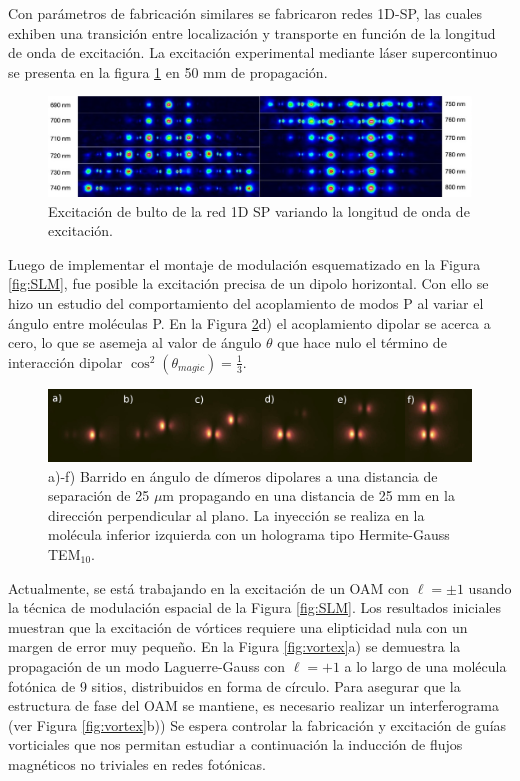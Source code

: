 \documentclass{article}
\begin{document}
Con parámetros de fabricación similares se fabricaron redes 1D-SP, las cuales exhiben una transición entre localización y transporte en función de la longitud de onda de excitación. La excitación experimental mediante láser supercontinuo se presenta en la figura \ref{fig:super} en 50 mm de propagación.

\begin{figure}[H]
	\centering
	\includegraphics[width=1.0\linewidth]{./media/SP1D.jpg}
	\caption{Excitación de bulto de la red 1D SP variando la longitud de onda de excitación. \label{fig:super}}
\end{figure}

Luego de implementar el montaje de modulación esquematizado en la Figura \ref{fig:SLM}, fue posible la excitación precisa de un dipolo horizontal. Con ello se hizo un estudio del comportamiento del acoplamiento de modos P al variar el ángulo entre moléculas P. En la Figura \ref{fig:dipoles}d) el acoplamiento dipolar se acerca a cero, lo que se asemeja al valor de ángulo $\theta$ que hace nulo el término de interacción dipolar $\cos^2(\theta_{magic}) = \frac{1}{3}$.  

\begin{figure}[H]
	\centering
	\includegraphics[width=0.9\linewidth]{./media/dipoles.jpg}
	\caption{a)-f) Barrido en ángulo de dímeros dipolares a una distancia de separación de 25 $\mu$m propagando en una distancia de 25 mm en la dirección perpendicular al plano. La inyección se realiza en la molécula inferior izquierda con un holograma tipo Hermite-Gauss TEM$_{10}$. \label{fig:dipoles}}
\end{figure}

Actualmente, se está trabajando en la excitación de un OAM con $\ell = \pm 1$ usando la técnica de modulación espacial de la Figura \ref{fig:SLM}. Los resultados iniciales muestran que la excitación de vórtices requiere una elipticidad nula con un margen de error muy pequeño. En la Figura \ref{fig:vortex}a) se demuestra la propagación de un modo Laguerre-Gauss con $\ell = +1$ a lo largo de una molécula fotónica de 9 sitios, distribuidos en forma de círculo. Para asegurar que la estructura de fase del OAM se mantiene, es necesario realizar un interferograma (ver Figura \ref{fig:vortex}b)) Se espera controlar la fabricación y excitación de guías vorticiales que nos permitan estudiar a continuación la inducción de flujos magnéticos no triviales en redes fotónicas.
\end{document}
